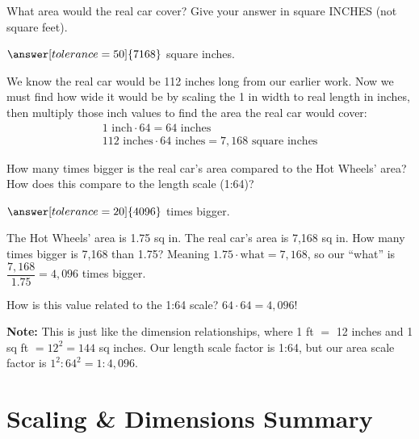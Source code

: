 \documentclass[12pt]{ximera}
\begin{document}
\begin{problem}
What area would the real car cover? Give your answer in square INCHES (not square
feet).

$\answer[tolerance=50]{7168}$ square inches.

\begin{solution}
We know the real car would be 112 inches long from our earlier work. Now we must find
how wide it would be by scaling the 1 in width to real length in inches, then multiply
those inch values to find the area the real car would cover:
\begin{gather*}
1\text{ inch} \cdot 64 = 64\text{ inches} \\
112\text{ inches} \cdot 64\text{ inches} = 7{,}168\text{ square inches}
\end{gather*}
\end{solution}
\end{problem}

\begin{problem}
How many times bigger is the real car's area compared to the Hot Wheels' area? How does
this compare to the length scale (1:64)?

$\answer[tolerance=20]{4096}$ times bigger.

\begin{freeResponse}
\end{freeResponse}

\begin{solution}
The Hot Wheels' area is 1.75 sq in. The real car's area is 7,168 sq in. How many times
bigger is 7,168 than 1.75? Meaning $1.75 \cdot \text{what} = 7{,}168$, so our ``what''
is $\dfrac{7{,}168}{1.75} = 4{,}096$ times bigger.

How is this value related to the 1:64 scale? $64 \cdot 64 = 4{,}096$!

\textbf{Note:} This is just like the dimension relationships, where 1 ft $=$ 12 inches
and 1 sq ft $= 12^{2} = 144$ sq inches. Our length scale factor is 1:64, but our area
scale factor is $1^{2} : 64^{2} = 1 : 4{,}096$.
\end{solution}
\end{problem}

\section*{Scaling \& Dimensions Summary}
\end{document}
